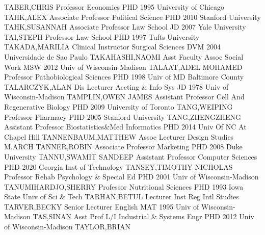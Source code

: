 \documentclass[
]{article}
\begin{document}
TABER,CHRIS \textbar Professor \textbar Economics \textbar PHD 1995
University of Chicago \textbar{}  \textbar TAHK,ALEX
\textbar Associate Professor \textbar Political Science \textbar PHD
2010 Stanford University \textbar{}  \textbar TAHK,SUSANNAH
\textbar Associate Professor \textbar Law School \textbar JD 2007 Yale
University \textbar{}  \textbar TAI,STEPH \textbar Professor
\textbar Law School \textbar PHD 1997 Tufts University \textbar{}
 \textbar TAKADA,MARILIA \textbar Clinical Instructor
\textbar Surgical Sciences \textbar DVM 2004 Universidade de Sao Paulo
\textbar{}  \textbar TAKAHASHI,NAOMI \textbar Asst Faculty
Assoc \textbar Social Work \textbar MSW 2012 Univ of Wisconsin-Madison
\textbar{}  \textbar TALAAT,ADEL MOHAMED \textbar Professor
\textbar Pathobiological Sciences \textbar PHD 1998 Univ of MD Baltimore
County \textbar{}  \textbar TALARCZYK,ALAN \textbar Dis
Lecturer \textbar Accting \& Info Sys \textbar JD 1978 Univ of
Wisconsin-Madison \textbar{}  \textbar TAMPLIN,OWEN JAMES
\textbar Assistant Professor \textbar Cell And Regenerative Biology
\textbar PHD 2009 University of Toronto \textbar{} 
\textbar TANG,WEIPING \textbar Professor \textbar Pharmacy \textbar PHD
2005 Stanford University \textbar{} 
\textbar TANG,ZHENGZHENG \textbar Assistant Professor
\textbar Biostatistics\&Med Informatics \textbar PHD 2014 Univ Of NC At
Chapel Hill \textbar{}  \textbar TANNENBAUM,MATTHEW
\textbar Assoc Lecturer \textbar Design Studies \textbar M.ARCH
\textbar{}  \textbar TANNER,ROBIN \textbar Associate
Professor \textbar Marketing \textbar PHD 2008 Duke University
\textbar{}  \textbar TANNU,SWAMIT SANDEEP \textbar Assistant
Professor \textbar Computer Sciences \textbar PHD 2020 Georgia Inst of
Technology \textbar{}  \textbar TANSEY,TIMOTHY NICHOLAS
\textbar Professor \textbar Rehab Psychology \& Special Ed \textbar PHD
2001 Univ of Wisconsin-Madison \textbar{} 
\textbar TANUMIHARDJO,SHERRY \textbar Professor \textbar Nutritional
Sciences \textbar PHD 1993 Iowa State Univ of Sci \& Tech \textbar{}
 \textbar TARHAN,BETUL \textbar Lecturer \textbar Inst Reg
Intl Studies \textbar TARVER,BECKY \textbar{} 
\textbar Senior Lecturer \textbar English \textbar MAT 1995 Univ of
Wisconsin-Madison \textbar TAS,SINAN \textbar{} 
\textbar Asst Prof L/I \textbar Industrial \& Systems Engr \textbar PHD
2012 Univ of Wisconsin-Madison \textbar TAYLOR,BRIAN \textbar{}
\end{document}
